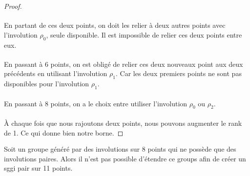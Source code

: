 \begin{proof}
  \item

  \paragraph{}
  En partant de ces deux points, on doit les relier à deux autres points avec l'involution $\rho_0$, seule disponible. Il est impossible de relier ces deux points entre eux.

  \paragraph{}
  En passant à 6 points, on est obligé de relier ces deux nouveaux point aux deux précédents en utilisant l'involution $\rho_1$. Car les deux premiers points ne sont pas disponibles pour l'involution $\rho_1$.

  \paragraph{}
  En passant à 8 points, on a le choix entre utiliser l'involution $\rho_0$ ou $\rho_2$.

  \paragraph{}
  À chaque fois que nous rajoutons deux points, nous pouvons augmenter le rank de 1. Ce qui donne bien notre borne.
\end{proof}

\begin{theorem}
  Soit un groupe généré par des involutions sur 8 points qui ne possède que des involutions paires. Alors il n'est pas possible d'étendre ce groups afin de créer un sggi pair sur 11 points.
\end{theorem}

